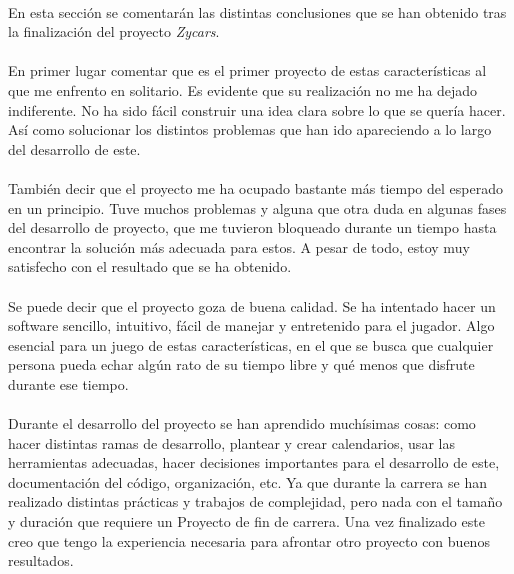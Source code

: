 
\paragraph{}
En esta sección se comentarán las distintas conclusiones que se han obtenido tras la finalización del proyecto \emph{Zycars}.

\paragraph{}
En primer lugar comentar que es el primer proyecto de estas características al que me enfrento en solitario. Es evidente que su
realización no me ha dejado indiferente. No ha sido fácil construir una idea clara sobre lo que se quería hacer. Así como
solucionar los distintos problemas que han ido apareciendo a lo largo del desarrollo de este.

\paragraph{}
También decir que el proyecto me ha ocupado bastante más tiempo del esperado en un principio. Tuve muchos problemas y alguna que 
otra duda en algunas fases del desarrollo de proyecto, que me tuvieron bloqueado durante un tiempo hasta encontrar la solución
más adecuada para estos. A pesar de todo, estoy muy satisfecho con el resultado que se ha obtenido.

\paragraph{}
Se puede decir que el proyecto goza de buena calidad. Se ha intentado hacer un
software sencillo, intuitivo, fácil de manejar y 
entretenido para el jugador. Algo esencial para un juego de estas características, en el que se busca que cualquier persona
pueda echar algún rato de su tiempo libre y qué menos que disfrute durante ese tiempo.

\paragraph{}
Durante el desarrollo del proyecto se han aprendido muchísimas cosas: como hacer distintas ramas de desarrollo, plantear y crear
calendarios, usar las herramientas adecuadas, hacer decisiones importantes para el desarrollo de este, documentación del 
código, organización, etc. Ya que durante la carrera se han realizado distintas prácticas y trabajos de complejidad, pero nada
con el tamaño y duración que requiere un Proyecto de fin de carrera. Una vez finalizado este creo que tengo la experiencia necesaria
para afrontar otro proyecto con buenos resultados.


